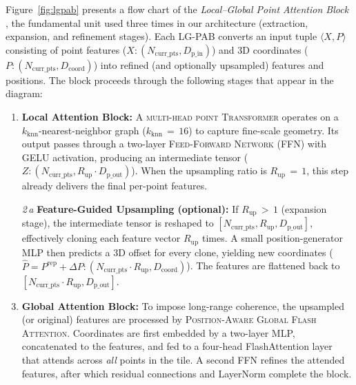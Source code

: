 \documentclass[remotesensing,article,accept,pdftex,moreauthors]{Definitions/mdpi}
\renewcommand{\hl}[1]{#1}
\begin{document}


Figure~\ref{fig:lgpab} presents a flow chart of the \emph{\hl{Local–Global Point Attention Block}%
}, the fundamental unit used three times in our architecture (extraction, expansion, and refinement stages). Each LG-PAB converts an input tuple $\langle X, P \rangle$ consisting of point features ($X: (N_{\text{curr\_pts}}, D_{\text{p\_in}})$) and 3D coordinates ($P: (N_{\text{curr\_pts}}, D_{\text{coord}})$) into refined (and optionally upsampled) features and positions. The block proceeds through the following stages that appear in the diagram:

\begin{enumerate}[leftmargin=*]
\item \textbf{\hl{Local Attention Block:}}
      A %
      \textsc{multi-head point Transformer} operates on a $k_{\text{knn}}$-nearest-neighbor graph ($k_{\text{knn}}\,{=}\,16$) to capture fine-scale geometry. Its output passes through a two-layer \textsc{Feed-Forward Network} (FFN) with GELU activation, producing an intermediate tensor
      ($Z: (N_{\text{curr\_pts}}, R_{\text{up}} \cdot D_{\text{p\_out}})$). When the upsampling ratio is $R_{\text{up}}\,{=}\,1$, this step already delivers the final per-point features.

\item[\emph{2\,a}] \textbf{\hl{Feature-Guided Upsampling (optional):} %
}
      If $R_{\text{up}}\,{>}\,1$ (expansion stage), the intermediate tensor is reshaped to $[N_{\text{curr\_pts}}, R_{\text{up}}, D_{\text{p\_out}}]$, effectively cloning each feature vector $R_{\text{up}}$ times.
      A small position-generator MLP then predicts a 3D offset for every clone, yielding new coordinates
      ($\hat{P} = P^{\text{rep}} + \Delta P: (N_{\text{curr\_pts}} \cdot R_{\text{up}}, D_{\text{coord}})$).
      The features are flattened back to $[N_{\text{curr\_pts}} \cdot R_{\text{up}}, D_{\text{p\_out}}]$.

\item \textbf{\hl{Global Attention Block}:}
      To impose long-range coherence, the upsampled (or original) features are processed by %
      \textsc{Position-Aware Global Flash Attention}. Coordinates are first embedded by a two-layer MLP, concatenated to the features, and fed to a four-head FlashAttention layer that attends across \emph{\hl{all}} points in the tile. A second FFN refines the attended features, after which residual connections and LayerNorm complete the block.
\end{enumerate}
\end{document}
